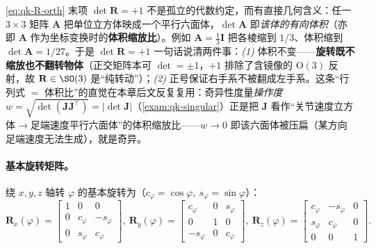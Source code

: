 \begin{note}[$\det\mathbf{R}=+1$ 的几何含义：旋转不缩放体积（连向后文操作度）]\label{note:qk-det-volume}
\cref{eq:qk-R-orth} 末项 $\det\mathbf{R}=+1$ 不是孤立的代数约定，而有直接几何含义\cite{unitree2023quadruped}：任一 $3\times3$ 矩阵 $\mathbf{A}$ 把单位立方体映成一个平行六面体，$\det\mathbf{A}$ 即\emph{该体的有向体积}（亦即 $\mathbf{A}$ 作为坐标变换时的\textbf{体积缩放比}）。例如 $\mathbf{A}=\tfrac13\mathbf{I}$ 把各棱缩到 $1/3$、体积缩到 $\det\mathbf{A}=1/27$。于是 $\det\mathbf{R}=+1$ 一句话说清两件事：\emph{(1)} 体积不变——\textbf{旋转既不缩放也不翻转物体}（正交矩阵本可 $\det=\pm1$，$+1$ 排除了含镜像的 $\mathrm{O}(3)$ 反射，故 $\mathbf{R}\in\SO(3)$ 是“纯转动”）；\emph{(2)} 正号保证右手系不被翻成左手系。这条“行列式 $=$ 体积比”的直觉在本章后文反复复用：奇异性度量\emph{操作度} $w=\sqrt{\det(\mathbf{J}\mathbf{J}^\top)}=|\det\mathbf{J}|$（\cref{exam:qk-singular}）正是把 $\mathbf{J}$ 看作“关节速度立方体$\to$足端速度平行六面体”的体积缩放比——$w\to0$ 即该六面体被压扁（某方向足端速度无法生成），就是奇异。
\end{note}

\paragraph{基本旋转矩阵。}
绕 $x,y,z$ 轴转 $\varphi$ 的基本旋转为（$c_\varphi=\cos\varphi,\ s_\varphi=\sin\varphi$）\cite{yu2021quadruped,unitree2023quadruped}：
\begin{equation}
  \mathbf{R}_x(\varphi)=\begin{bmatrix}1&0&0\\0&c_\varphi&-s_\varphi\\0&s_\varphi&c_\varphi\end{bmatrix},\
  \mathbf{R}_y(\varphi)=\begin{bmatrix}c_\varphi&0&s_\varphi\\0&1&0\\-s_\varphi&0&c_\varphi\end{bmatrix},\
  \mathbf{R}_z(\varphi)=\begin{bmatrix}c_\varphi&-s_\varphi&0\\s_\varphi&c_\varphi&0\\0&0&1\end{bmatrix}.
  \label{eq:qk-basic-R}
\end{equation}

